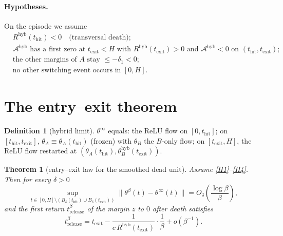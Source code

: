 \documentclass[11pt]{article}
\newtheorem{theorem}{Theorem}
\theoremstyle{definition}
\newtheorem{definition}[definition]{Definition}
\theoremstyle{remark}
\newcommand{\thit}{t_{\mathrm{hit}}}
\newcommand{\texit}{t_{\mathrm{exit}}}
\newcommand{\Ar}{\mathcal{A}}                      %
\newcommand{\hyb}{\mathrm{hyb}}
\begin{document}
\paragraph{Hypotheses.} On the episode we assume
\begin{align}
&R^{\hyb}(\thit)<0 \quad\text{(transversal death)};
  \tag{H1}\label{H1}\\
&\Ar^{\hyb}\text{ has a first zero at }\texit<H\text{ with }
  R^{\hyb}(\texit)>0\text{ and }\Ar^{\hyb}<0\text{ on }(\thit,\texit);
  \tag{H2}\label{H2}\\
&\text{the other margins of }A\text{ stay }\le-\delta_1<0;
  \tag{H3}\label{H3}\\
&\text{no other switching event occurs in }[0,H].
  \tag{H4}\label{H4}
\end{align}

\section{The entry--exit theorem}\label{sec:theorem}

\begin{definition}[hybrid limit]\label{def:hybrid}
$\theta^\infty$ equals: the ReLU flow on $[0,\thit]$; on $[\thit,\texit]$,
$\theta_A\equiv\theta_A(\thit)$ (frozen) with $\theta_B$ the $B$-only flow; on
$[\texit,H]$, the ReLU flow restarted at
$(\theta_A(\thit),\theta_B^{\hyb}(\texit))$.
\end{definition}

\begin{theorem}[entry--exit law for the smoothed dead unit]\label{thm:main}
Assume \eqref{H1}--\eqref{H4}. Then for every $\delta>0$
\begin{equation}\label{eq:sup}
\sup_{t\in[0,H]\setminus(B_\delta(\thit)\cup B_\delta(\texit))}
\bigl\|\theta^\beta(t)-\theta^\infty(t)\bigr\|
= O_\delta\!\left(\frac{\log\beta}{\beta}\right),
\end{equation}
and the first return $t^\beta_{\mathrm{release}}$ of the margin $z$ to $0$ after
death satisfies
\begin{equation}\label{eq:release}
t^\beta_{\mathrm{release}}
=\texit-\frac{1}{c\,R^{\hyb}(\texit)}\cdot\frac{1}{\beta}+o(\beta^{-1}).
\end{equation}
\end{theorem}
\end{document}
